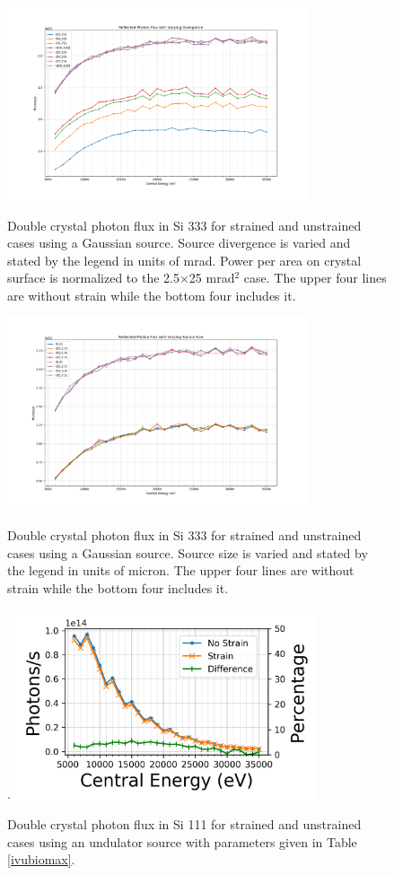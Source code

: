 \documentclass[preprint]{iucr}              %
\begin{document}
\begin{figure}
\caption{Double crystal photon flux in Si 333 for strained and unstrained cases using a Gaussian source. Source divergence is varied and stated by the legend in units of mrad. Power per area on crystal surface is normalized to the 2.5$\times$25 mrad$^2$ case. The upper four lines are without strain while the bottom four includes it.}
\includegraphics[width = 8.85cm]{images/333straindivergence.png}
\label{fig:333straindivergence}
\end{figure}

\begin{figure}
\caption{Double crystal photon flux in Si 333 for strained and unstrained cases using a Gaussian source. Source size is varied and stated by the legend in units of micron. The upper four lines are without strain while the bottom four includes it.}
\includegraphics[width = 8.85cm]{images/333strainsize.png}
\label{fig:333strainsourcesize}
\end{figure}

\begin{figure}
\caption{Double crystal photon flux in Si 111 for strained and unstrained cases using an undulator source with parameters given in Table \ref{ivubiomax}.}.
\includegraphics[width = 8.85cm]{images/ivu111flux.png}
\label{fig:ivu111flux}
\end{figure}
\end{document}
